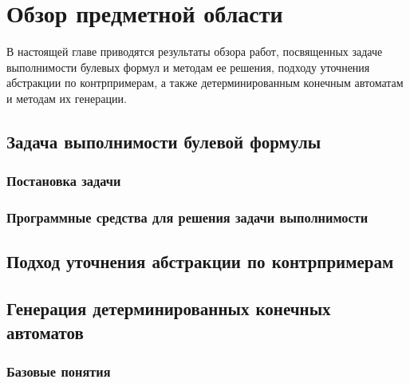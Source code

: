 
\chapter{Обзор предметной области} 
\label{sec:review}

В настоящей главе приводятся результаты обзора работ, посвященных задаче выполнимости булевых формул и методам ее решения, подходу уточнения абстракции по контрпримерам, а также детерминированным конечным автоматам и методам их генерации.

\section{Задача выполнимости булевой формулы}
\label{sec:review:sat}

\subsection{Постановка задачи}
\label{sec:review:sat:problem}

\subsection{Программные средства для решения задачи выполнимости}
\label{sec:review:sat:solvers}


\section{Подход уточнения абстракции по контрпримерам}
\label{sec:review:cegar}


\section{Генерация детерминированных конечных автоматов} 
\label{sec:review:dfa-inf}

\subsection{Базовые понятия} 
\label{sec:review:dfa-inf:dfa-def}

